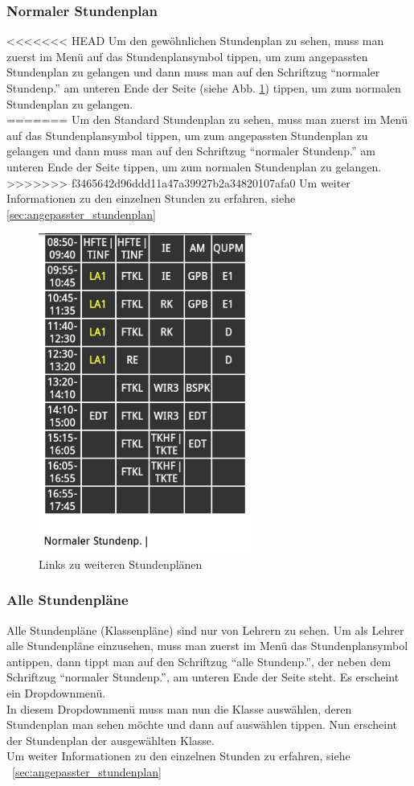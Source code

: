 \subsubsection{Normaler Stundenplan}
<<<<<<< HEAD
Um den gewöhnlichen Stundenplan zu sehen, muss man zuerst im Menü auf das Stundenplansymbol tippen, um zum angepassten Stundenplan zu gelangen und dann muss man auf den Schriftzug \enquote{normaler Stundenp.} am unteren Ende der Seite (siehe Abb. \ref{fig:App_Timetable_Bottom}) tippen, um zum normalen Stundenplan zu gelangen.\\
=======
Um den Standard Stundenplan zu sehen, muss man zuerst im Menü auf das Stundenplansymbol tippen, um zum angepassten Stundenplan zu gelangen und dann muss man auf den Schriftzug \enquote{normaler Stundenp.} am unteren Ende der Seite tippen, um zum normalen Stundenplan zu gelangen.\\
>>>>>>> f3465642d96ddd11a47a39927b2a34820107afa0
Um weiter Informationen zu den einzelnen Stunden zu erfahren, siehe \ref{sec:angepasster_stundenplan}

\begin{figure}[H]
\centering
\includegraphics[keepaspectratio=true, width=7cm]{images/app_instructions/appTimetBottom.png}
\caption{Links zu weiteren Stundenplänen}
\label{fig:App_Timetable_Bottom}
\end{figure}

\subsubsection{Alle Stundenpläne}
Alle Stundenpläne (Klassenpläne) sind nur von Lehrern zu sehen. Um als Lehrer alle Stundenpläne einzusehen, muss man zuerst im Menü das Stundenplansymbol antippen, dann tippt man auf den Schriftzug \enquote{alle Stundenp.}, der neben dem Schriftzug \enquote{normaler Stundenp.}, am unteren Ende der Seite steht. Es erscheint ein Dropdownmenü.\\
In diesem Dropdownmenü muss man nun die Klasse auswählen, deren Stundenplan man sehen möchte und dann auf auswählen tippen. Nun erscheint der Stundenplan der ausgewählten Klasse.\\
Um weiter Informationen zu den einzelnen Stunden zu erfahren, siehe ~\ref{sec:angepasster_stundenplan}

